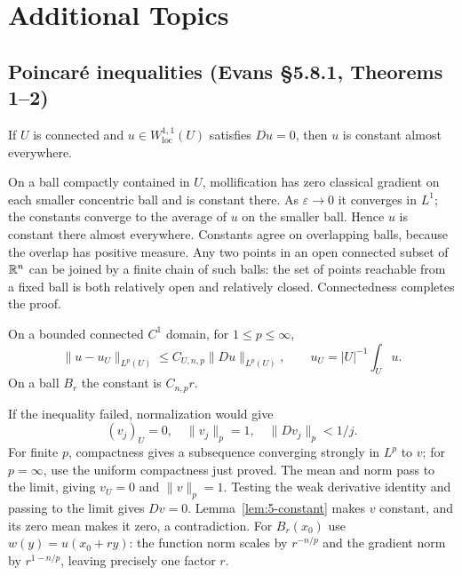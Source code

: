 \section{Additional Topics}
\label{sec:5-8}

\subsection{Poincaré inequalities (Evans \S5.8.1, Theorems 1--2)}
\begin{lemma}\label{lem:5-constant}
If $U$ is connected and $u\in W^{1,1}_{\mathrm{loc}}(U)$ satisfies
$Du=0$, then $u$ is constant almost everywhere.
\end{lemma}
\begin{expandedproof}
On a ball compactly contained in $U$, mollification has zero classical
gradient on each smaller concentric ball and is constant there.
As $\varepsilon\to0$ it converges in $L^1$; the constants converge to
the average of $u$ on the smaller ball. Hence $u$ is constant there
almost everywhere. Constants agree on overlapping balls, because the
overlap has positive measure. Any two points in an open connected
subset of $\mathbb{R}^n$ can be joined by a finite chain of such balls:
the set of points reachable from a fixed ball is both relatively open
and relatively closed. Connectedness completes the proof.
\end{expandedproof}
\Needspace{45mm}

\begin{theorem}\label{thm:5-poincare}
On a bounded connected $C^1$ domain, for $1\leq p\leq\infty$,
\[
 \|u-u_U\|_{L^p(U)}\leq C_{U,n,p}\|Du\|_{L^p(U)},\qquad
 u_U=|U|^{-1}\int_Uu.
\]
On a ball $B_r$ the constant is $C_{n,p}r$.
\end{theorem}
\begin{expandedproof}
If the inequality failed, normalization would give
\[
 (v_j)_U=0,\quad\|v_j\|_p=1,\quad\|Dv_j\|_p<1/j.
\]
For finite $p$, compactness gives a subsequence converging strongly
in $L^p$ to $v$; for $p=\infty$, use the uniform compactness just proved.
The mean and norm pass to the limit, giving $v_U=0$ and $\|v\|_p=1$.
Testing the weak derivative identity and passing to the limit gives
$Dv=0$. Lemma~\ref{lem:5-constant} makes $v$ constant, and its zero
mean makes it zero, a contradiction.
For $B_r(x_0)$ use $w(y)=u(x_0+ry)$:
the function norm scales by $r^{-n/p}$ and the gradient norm by
$r^{1-n/p}$, leaving precisely one factor $r$.
\end{expandedproof}


